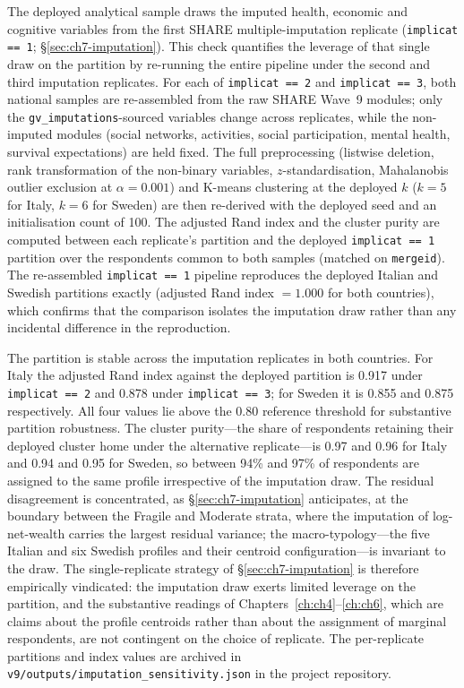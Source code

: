 The deployed analytical sample draws the imputed health, economic and cognitive variables from the first SHARE multiple-imputation replicate (\texttt{implicat == 1}; \S\ref{sec:ch7-imputation}). This check quantifies the leverage of that single draw on the partition by re-running the entire pipeline under the second and third imputation replicates. For each of \texttt{implicat == 2} and \texttt{implicat == 3}, both national samples are re-assembled from the raw SHARE Wave~9 modules; only the \texttt{gv\_imputations}-sourced variables change across replicates, while the non-imputed modules (social networks, activities, social participation, mental health, survival expectations) are held fixed. The full preprocessing (listwise deletion, rank transformation of the non-binary variables, $z$-standardisation, Mahalanobis outlier exclusion at $\alpha = 0.001$) and K-means clustering at the deployed $k$ ($k = 5$ for Italy, $k = 6$ for Sweden) are then re-derived with the deployed seed and an initialisation count of 100. The adjusted Rand index and the cluster purity are computed between each replicate's partition and the deployed \texttt{implicat == 1} partition over the respondents common to both samples (matched on \texttt{mergeid}). The re-assembled \texttt{implicat == 1} pipeline reproduces the deployed Italian and Swedish partitions exactly (adjusted Rand index $= 1.000$ for both countries), which confirms that the comparison isolates the imputation draw rather than any incidental difference in the reproduction.

The partition is stable across the imputation replicates in both countries. For Italy the adjusted Rand index against the deployed partition is 0.917 under \texttt{implicat == 2} and 0.878 under \texttt{implicat == 3}; for Sweden it is 0.855 and 0.875 respectively. All four values lie above the 0.80 reference threshold for substantive partition robustness. The cluster purity---the share of respondents retaining their deployed cluster home under the alternative replicate---is 0.97 and 0.96 for Italy and 0.94 and 0.95 for Sweden, so between 94\% and 97\% of respondents are assigned to the same profile irrespective of the imputation draw. The residual disagreement is concentrated, as \S\ref{sec:ch7-imputation} anticipates, at the boundary between the Fragile and Moderate strata, where the imputation of log-net-wealth carries the largest residual variance; the macro-typology---the five Italian and six Swedish profiles and their centroid configuration---is invariant to the draw. The single-replicate strategy of \S\ref{sec:ch7-imputation} is therefore empirically vindicated: the imputation draw exerts limited leverage on the partition, and the substantive readings of Chapters~\ref{ch:ch4}--\ref{ch:ch6}, which are claims about the profile centroids rather than about the assignment of marginal respondents, are not contingent on the choice of replicate. The per-replicate partitions and index values are archived in \texttt{v9/outputs/imputation\_sensitivity.json} in the project repository.


